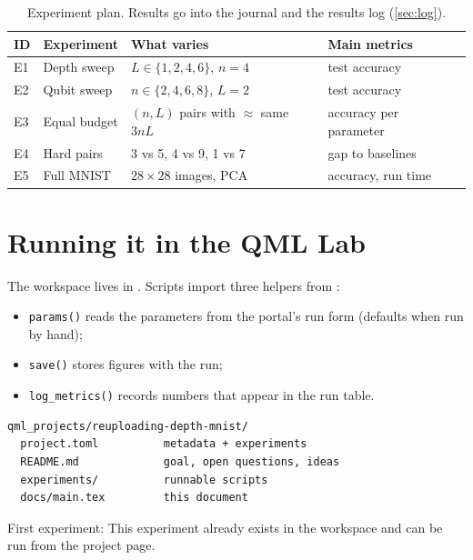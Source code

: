 \documentclass[11pt,a4paper]{article}
\begin{document}
\begin{table}[h]
\centering\small
\begin{tabularx}{\linewidth}{@{}l>{\raggedright}X>{\raggedright}X>{\raggedright\arraybackslash}X@{}}
\toprule
ID & Experiment & What varies & Main metrics \\
\midrule
  E1 & Depth sweep & $L\in\{1,2,4,6\}$, $n=4$ & test accuracy \\
  E2 & Qubit sweep & $n\in\{2,4,6,8\}$, $L=2$ & test accuracy \\
  E3 & Equal budget & $(n,L)$ pairs with $\approx$ same $3nL$ & accuracy per parameter \\
  E4 & Hard pairs & 3 vs 5, 4 vs 9, 1 vs 7 & gap to baselines \\
  E5 & Full MNIST & $28\times28$ images, PCA & accuracy, run time \\
\bottomrule
\end{tabularx}
\caption{Experiment plan. Results go into the journal and the results log (\cref{sec:log}).}
\end{table}

\section{Running it in the QML Lab}
The workspace lives in . Scripts import three helpers from
:
\begin{itemize}
  \item \texttt{params()} reads the parameters from the portal's run form (defaults when run by hand);
  \item \texttt{save()} stores figures with the run;
  \item \texttt{log\_metrics()} records numbers that appear in the run table.
\end{itemize}

\begin{lstlisting}
qml_projects/reuploading-depth-mnist/
  project.toml          metadata + experiments
  README.md             goal, open questions, ideas
  experiments/          runnable scripts
  docs/main.tex         this document
\end{lstlisting}

First experiment: This experiment already exists in the workspace and can be run from the project page.
\end{document}
